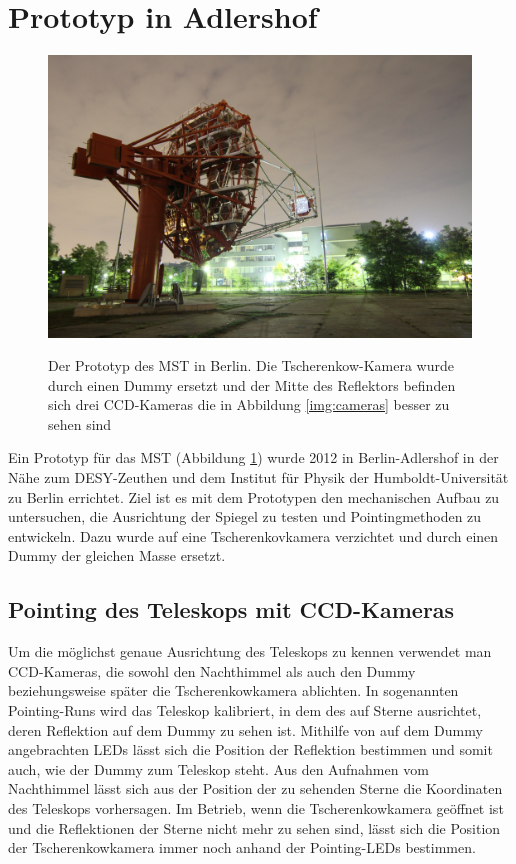 \section{Prototyp in Adlershof}
\begin{figure}
\centering
\includegraphics[width=\textwidth]{Images/night.png}
\label{img:mst}
\caption{Der Prototyp des MST in Berlin. Die Tscherenkow-Kamera wurde durch einen Dummy ersetzt und der Mitte des Reflektors befinden sich drei CCD-Kameras die in Abbildung \ref{img:cameras} besser zu sehen sind}
\end{figure}
Ein Prototyp für das MST (Abbildung \ref{img:mst}) wurde 2012 in Berlin-Adlershof in der Nähe zum DESY-Zeuthen und dem Institut für Physik der Humboldt-Universität zu Berlin errichtet. Ziel ist es mit dem Prototypen den mechanischen Aufbau zu untersuchen, die Ausrichtung der Spiegel zu testen und Pointingmethoden zu entwickeln. Dazu wurde auf eine Tscherenkovkamera verzichtet und durch einen Dummy der gleichen Masse ersetzt.

\subsection{Pointing des Teleskops mit CCD-Kameras}
Um die möglichst genaue Ausrichtung des Teleskops zu kennen verwendet man CCD-Kameras, die sowohl den Nachthimmel als auch den Dummy beziehungsweise später die Tscherenkowkamera ablichten. In sogenannten Pointing-Runs wird das Teleskop kalibriert, in dem des auf Sterne ausrichtet, deren Reflektion auf dem Dummy zu sehen ist. Mithilfe von auf dem Dummy angebrachten LEDs lässt sich die Position der Reflektion bestimmen und somit auch, wie der Dummy zum Teleskop steht. Aus den Aufnahmen vom Nachthimmel lässt sich aus der Position der zu sehenden Sterne die Koordinaten des Teleskops vorhersagen. Im Betrieb, wenn die Tscherenkowkamera geöffnet ist und die Reflektionen der Sterne nicht mehr zu sehen sind, lässt sich die Position der Tscherenkowkamera immer noch anhand der Pointing-LEDs bestimmen.

